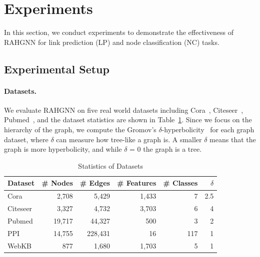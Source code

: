 \section{Experiments}
\label{section 5}
In this section, we conduct experiments to demonstrate the effectiveness of RAHGNN for link prediction (LP) and node classification (NC) tasks.
\subsection{Experimental Setup}

\paragraph{Datasets.} 
We evaluate RAHGNN on five real world datasets including Cora~\cite{sen2008cora}, Citeseer~\cite{GCN}, Pubmed~\cite{namata2012PUBMED}, and the dataset statistics are shown in Table~\ref{banchmark dataset}. 
Since we focus on the hierarchy of the graph, we compute the Gromov’s $\delta$-hyperbolicity~\cite{jonckheere2008scaled,narayan2011large,adcock2013tree} for each graph dataset, where $\delta$ can measure how tree-like a graph is. 
A smaller $\delta$ means that the graph is more hyperbolicity, and while $\delta$ = 0 the graph is a tree. 

\begin{table}
\caption{Statistics of Datasets}
\centering
\begin{tabular}{lrrrrr}
\toprule
\textbf{Dataset} & \textbf{\# Nodes} & \textbf{\# Edges} & \textbf{\# Features} & \textbf{\# Classes} & $\delta$\\
\midrule
Cora     & 2,708  & 5,429  & 1,433 & 7   & 2.5 \\
Citeseer & 3,327  & 4,732  & 3,703 & 6   & 4 \\
Pubmed   & 19,717 & 44,327 & 500   & 3   & 2 \\
PPI      & 14,755  & 228,431 & 16    & 117 & 1 \\
WebKB    & 877    & 1,680   & 1,703  & 5   & 1 \\
\bottomrule
\end{tabular}
\label{banchmark dataset}
\end{table}


